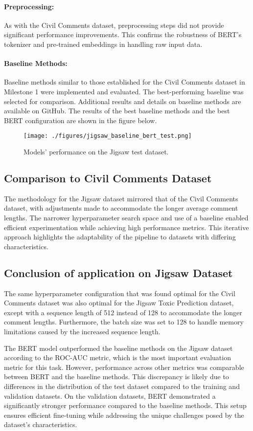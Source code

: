 \paragraph{Preprocessing:} As with the Civil Comments dataset, preprocessing steps did not provide significant performance improvements. This confirms the robustness of BERT's tokenizer and pre-trained embeddings in handling raw input data.

\paragraph{Baseline Methods:} Baseline methods similar to those established for the Civil Comments dataset in Milestone 1 were implemented and evaluated. The best-performing baseline was selected for comparison. Additional results and details on baseline methods are available on GitHub. The results of the best baseline methods and the best BERT configuration are shown in the figure below.

\begin{figure}[ht] \centering \texttt{[image: ./figures/jigsaw\_baseline\_bert\_test.png]} \caption{Models' performance on the Jigsaw test dataset.} \label{fig:performance_test_set_jigsaw} \end{figure}

\subsection{Comparison to Civil Comments Dataset}

The methodology for the Jigsaw dataset mirrored that of the Civil Comments dataset, with adjustments made to accommodate the longer average comment lengths. The narrower hyperparameter search space and use of a baseline enabled efficient experimentation while achieving high performance metrics. This iterative approach highlights the adaptability of the pipeline to datasets with differing characteristics.

\subsection{Conclusion of application on Jigsaw Dataset}

The same hyperparameter configuration that was found optimal for the Civil Comments dataset was also optimal for the Jigsaw Toxic Prediction dataset, except with a sequence length of 512 instead of 128 to accommodate the longer comment lengths. Furthermore, the batch size was set to 128 to handle memory limitations caused by the increased sequence length.

The BERT model outperformed the baseline methods on the Jigsaw dataset according to the ROC-AUC metric, which is the most important evaluation metric for this task. However, performance across other metrics was comparable between BERT and the baseline methods. This discrepancy is likely due to differences in the distribution of the test dataset compared to the training and validation datasets. On the validation datasets, BERT demonstrated a significantly stronger performance compared to the baseline methods. This setup ensures efficient fine-tuning while addressing the unique challenges posed by the dataset's characteristics.